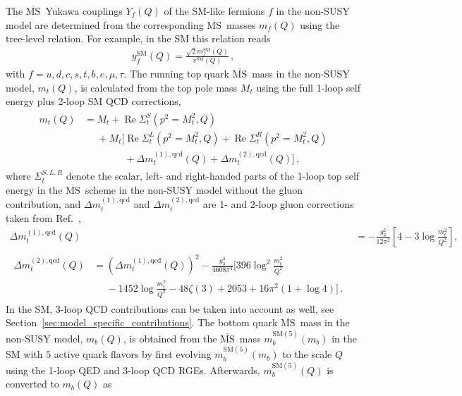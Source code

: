 \documentclass[final,3p,11pt,pdflatex]{elsarticle}
\newcommand{\ol}[1]{\overline{#1}}
\newcommand{\MSbar}{\ensuremath{\ol{\text{MS}}}\xspace}
\newcommand{\SM}{\ensuremath{\text{SM}}\xspace}
\newcommand{\secref}[1]{Section~\ref{#1}}
\DeclareMathOperator{\re}{Re}
\begin{document}
The \MSbar\ Yukawa couplings $Y_f(Q)$ of the SM-like
fermions $f$ in the non-SUSY model are determined from the
corresponding \MSbar\ masses $m_f(Q)$ using the tree-level
relation. For example, in the SM this relation reads
%
\begin{align}
  y_f^{\SM}(Q) = \frac{\sqrt{2} m_f^{\SM}(Q)}{v^{\SM}(Q)} \,,
\end{align}
%
with $f = u,d,c,s,t,b,e,\mu,\tau$.
The running top quark \MSbar\ mass in the non-SUSY model, $m_t(Q)$, is
calculated from the top pole mass $M_t$
using the full 1-loop self energy plus 2-loop SM QCD
corrections,
%
\begin{align}
\begin{split}
  m_t(Q) &= M_t + \re\Sigma_{t}^S(p^2=M_t^2,Q) \\
  &\phantom{={}} + M_t \Big[ \re\Sigma_{t}^L(p^2=M_t^2,Q) +
    \re\Sigma_{t}^R(p^2=M_t^2,Q) \\
  &\phantom{={} + M_t \Big[}
    + \Delta m_t^{(1),\text{qcd}}(Q) + \Delta m_t^{(2),\text{qcd}}(Q) \Big]
  \,,
\end{split}
\end{align}
%
where $\Sigma_{t}^{S,L,R}$ denote the scalar, left- and right-handed
parts of the 1-loop top self energy in the \MSbar\ scheme in the
non-SUSY model without the gluon
contribution, and $\Delta m_t^{(1),\text{qcd}}$ and $\Delta
m_t^{(2),\text{qcd}}$ are 1- and 2-loop gluon corrections taken from
Ref.~\cite{Fleischer:1998dw},
%
\begin{align}
  \Delta m_t^{(1),\text{qcd}}(Q) &=
  -\frac{g_3^2}{12 \pi^2} \left[4 - 3 \log\frac{m_t^2}{Q^2}\right],
  \label{eq:top-selfenergy-qcd-1L}\\
  \begin{split}
    \Delta m_t^{(2),\text{qcd}}(Q) &= \left(\Delta
      m_t^{(1),\text{qcd}}(Q)\right)^2 - \frac{g_3^4}{4608 \pi^4}
    \Bigg[396 \log^2\frac{m_t^2}{Q^2} \\
    &\phantom{={}} - 1452 \log\frac{m_t^2}{Q^2}
    - 48 \zeta(3) + 2053 + 16 \pi^2 (1+\log 4)\Bigg] \,.
  \end{split}
  \label{eq:top-selfenergy-qcd-2L}
\end{align}
%
In the SM, 3-loop QCD contributions can be taken into
account as well, see \secref{sec:model_specific_contributions}.
%
The bottom quark \MSbar\ mass in the non-SUSY model, $m_b(Q)$, is
obtained from the \MSbar\ mass $m_b^{\SM(5)}(m_b)$ in the SM with $5$ active quark flavors by first evolving
$m_b^{\SM(5)}(m_b)$ to the scale $Q$ using the 1-loop QED and 3-loop
QCD RGEs.  Afterwards, $m_b^{\SM(5)}(Q)$ is converted to $m_b(Q)$ as
\end{document}
